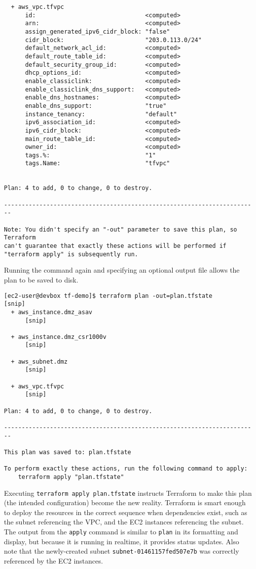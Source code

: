 \begin{verbatim}
  + aws_vpc.tfvpc
      id:                               <computed>
      arn:                              <computed>
      assign_generated_ipv6_cidr_block: "false"
      cidr_block:                       "203.0.113.0/24"
      default_network_acl_id:           <computed>
      default_route_table_id:           <computed>
      default_security_group_id:        <computed>
      dhcp_options_id:                  <computed>
      enable_classiclink:               <computed>
      enable_classiclink_dns_support:   <computed>
      enable_dns_hostnames:             <computed>
      enable_dns_support:               "true"
      instance_tenancy:                 "default"
      ipv6_association_id:              <computed>
      ipv6_cidr_block:                  <computed>
      main_route_table_id:              <computed>
      owner_id:                         <computed>
      tags.%:                           "1"
      tags.Name:                        "tfvpc"


Plan: 4 to add, 0 to change, 0 to destroy.

------------------------------------------------------------------------

Note: You didn't specify an "-out" parameter to save this plan, so Terraform
can't guarantee that exactly these actions will be performed if
"terraform apply" is subsequently run.
\end{verbatim}

Running the command again and specifying an optional output file allows the
plan to be saved to disk.

\begin{verbatim}
[ec2-user@devbox tf-demo]$ terraform plan -out=plan.tfstate
[snip]
  + aws_instance.dmz_asav
      [snip]

  + aws_instance.dmz_csr1000v
      [snip]

  + aws_subnet.dmz
      [snip]

  + aws_vpc.tfvpc
      [snip]

Plan: 4 to add, 0 to change, 0 to destroy.

------------------------------------------------------------------------

This plan was saved to: plan.tfstate

To perform exactly these actions, run the following command to apply:
    terraform apply "plan.tfstate"
\end{verbatim}

Executing \verb|terraform apply plan.tfstate| instructs Terraform to make this plan
(the intended configuration) become the new reality. Terraform is smart enough
to deploy the resources in the correct sequence when dependencies exist, such
as the subnet referencing the VPC, and the EC2 instances referencing the
subnet. The output from the \verb|apply| command is similar to \verb|plan| in its
formatting and display, but because it is running in realtime, it provides
status updates. Also note that the newly-created subnet
\verb|subnet-01461157fed507e7b| was correctly referenced by the EC2 instances.

